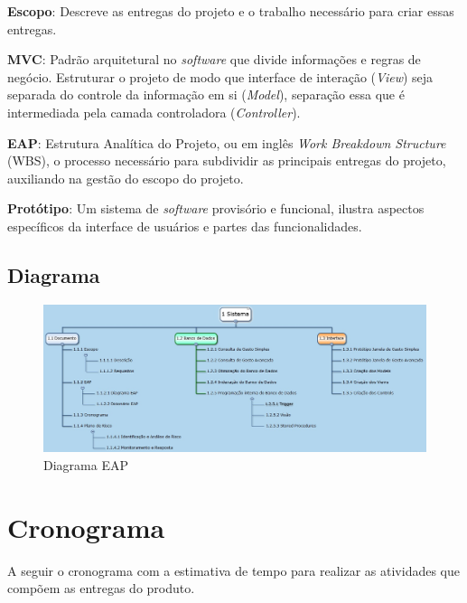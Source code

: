 \documentclass[a4paper,12pt]{article}
\begin{document}
{\bf Escopo}: Descreve as entregas do projeto e o trabalho
necessário para criar essas entregas.

{\bf MVC}: Padrão arquitetural no \textit{software} que divide informações e regras de negócio. Estruturar o projeto de modo que interface de interação (\textit{View}) seja separada do controle da informação em si (\textit{Model}), separação essa que é intermediada pela camada controladora (\textit{Controller}).

{\bf EAP}: Estrutura Analítica do Projeto, ou em inglês \textit{Work Breakdown Structure} (WBS), o processo necessário para subdividir as principais entregas do projeto, auxiliando na gestão do escopo do projeto.

{\bf Protótipo}: Um sistema de \textit{software} provisório e funcional, ilustra aspectos específicos da interface de usuários e partes das funcionalidades.

\subsection{Diagrama}


\begin{figure}[!htb]
	\centering
	\includegraphics[width=\textwidth,height=\textheight,keepaspectratio]{Imagens/trab_copy.jpg}
  	\caption{Diagrama EAP}
\end{figure}


\newpage
\section{Cronograma}

A seguir o cronograma com a estimativa de tempo para realizar as atividades que compõem as entregas do produto.\\
\end{document}
